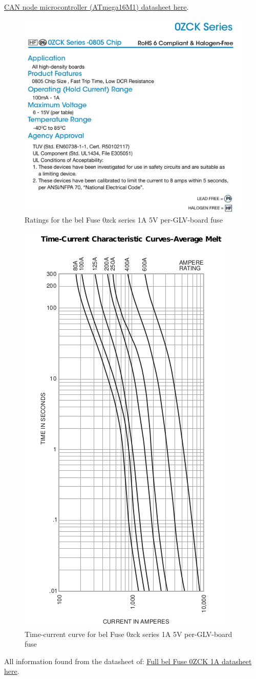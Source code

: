 \documentclass{article}
\begin{document}
\href{http://www.atmel.com/images/8209s.pdf}{CAN node microcontroller (ATmega16M1) datasheet here}.

\begin{figure}[H]
    \centering
    \includegraphics[width = 0.4 \textwidth]{1AGLVlowratings}
    \caption{Ratings for the bel Fuse 0zck series 1A 5V per-GLV-board fuse}
    \label{5V1Afuserating}
\end{figure}

\begin{figure}[H]
    \centering
    \includegraphics[width = 0.4 \textwidth]{TSfuseT-Agraph}
    \caption{Time-current curve for bel Fuse 0zck series 1A 5V per-GLV-board fuse}
    \label{5V1Afusecurve}
\end{figure}

All information found from the datasheet of:
\href{http://www.belfuse.com/pdfs/0ZCK.pdf}{Full bel Fuse 0ZCK 1A datasheet here}.

\end{document}
